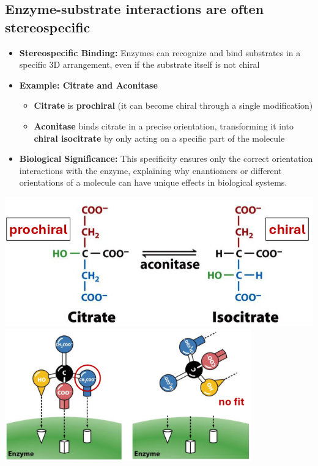 \documentclass[10pt]{article}
\begin{document}
\subsection*{Enzyme-substrate interactions are often stereospecific}
\begin{itemize}
    \item \textbf{Stereospecific Binding:} Enzymes can recognize and bind substrates in a specific 3D arrangement, even if the substrate itself is not chiral
    \item \textbf{Example: Citrate and Aconitase}
    \begin{itemize}
        \item \textbf{Citrate} is \textbf{prochiral} (it can become chiral through a single modification)
        \item \textbf{Aconitase} binds citrate in a precise orientation, transforming it into \textbf{chiral isocitrate} by only acting on a specific part of the molecule
    \end{itemize}
    \item \textbf{Biological Significance:} This specificity ensures only the correct orientation interactions with the enzyme, explaining why enantiomers or different orientations of a molecule can have unique effects in biological systems.
\end{itemize}
\begin{center}
    \includegraphics*[scale=0.5]{L1_13.png}\\
    \includegraphics*[width=0.8\textwidth]{L1_14.png}
\end{center}
\end{document}
